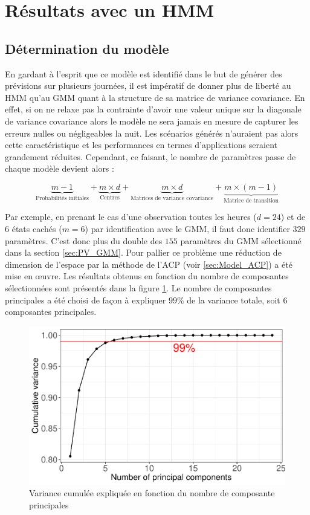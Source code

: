 \documentclass[12pt, french]{report}
\begin{document}
\section{Résultats avec un HMM}
\label{sec:PV_HMM}

\subsection{Détermination du modèle}

En gardant à l'esprit que ce modèle est identifié dans le but de générer des prévisions sur plusieurs journées, il est impératif de donner plus de liberté au HMM qu'au GMM quant à la structure de sa matrice de variance covariance. En effet, si on ne relaxe pas la contrainte d'avoir une valeur unique sur la diagonale de variance covariance alors le modèle ne sera jamais en mesure de capturer les erreurs nulles ou négligeables la nuit. Les scénarios générés n'auraient pas alors cette caractéristique et les performances en termes d'applications seraient grandement réduites. Cependant, ce faisant, le nombre de paramètres passe de chaque modèle devient alors :

\begin{equation}
\underbrace{m-1}_\text{Probabilités initiales}  + \underbrace{m \times d}_\text{Centres}  +  \underbrace{m \times d}_\text{Matrices de variance covariance} + \underbrace{m \times (m-1)}_\text{Matrice de transition}
\end{equation}

Par exemple, en prenant le cas d'une observation toutes les heures ($d=24$) et de 6 états cachés ($m=6$) par identification avec le GMM, il faut donc identifier $329$ paramètres. C'est donc plus du double des $155$ paramètres du GMM sélectionné dans la section \ref{sec:PV_GMM}. Pour pallier ce problème une réduction de dimension de l'espace par la méthode de l'ACP (voir \ref{sec:Model_ACP}) a été mise en œuvre. Les résultats obtenus en fonction du nombre de composantes sélectionnées sont présentés dans la figure \ref{fig:PV_HMM_ACP_DimSelect}. Le nombre de composantes principales a été choisi de façon à expliquer $99 \%$ de la variance totale, soit 6 composantes principales. 

\begin{figure}[htbp]
	\centering
	\includegraphics[width = 0.6 \linewidth]{Images/PV/ACP/ACP_DimSelect.pdf}
	\caption{Variance cumulée expliquée en fonction du nombre de composante principales}
	\label{fig:PV_HMM_ACP_DimSelect}
\end{figure}
\end{document}
